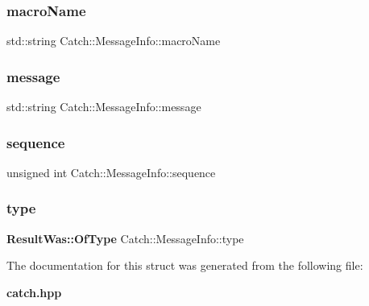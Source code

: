 \mbox{\label{struct_catch_1_1_message_info_a156ade4b3cc731f6ec7b542ae47ba8e3}} 
\subsubsection{macro\+Name}
{\footnotesize\ttfamily std\+::string Catch\+::\+Message\+Info\+::macro\+Name}

\mbox{\label{struct_catch_1_1_message_info_ab6cd06e050bf426c6577502a5c50e256}} 
\subsubsection{message}
{\footnotesize\ttfamily std\+::string Catch\+::\+Message\+Info\+::message}

\mbox{\label{struct_catch_1_1_message_info_a7f4f57ea21e50160adefce7b68a781d6}} 
\subsubsection{sequence}
{\footnotesize\ttfamily unsigned int Catch\+::\+Message\+Info\+::sequence}

\mbox{\label{struct_catch_1_1_message_info_ae928b9117465c696e45951d9d0284e78}} 
\subsubsection{type}
{\footnotesize\ttfamily \textbf{ Result\+Was\+::\+Of\+Type} Catch\+::\+Message\+Info\+::type}



The documentation for this struct was generated from the following file\+:\begin{DoxyCompactItemize}
\item 
\textbf{ catch.\+hpp}\end{DoxyCompactItemize}
